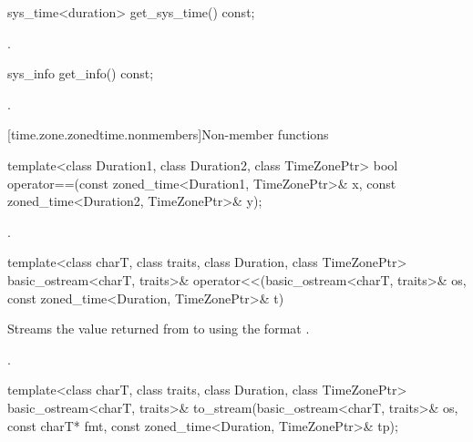 %
\begin{itemdecl}
sys_time<duration> get_sys_time() const;
\end{itemdecl}

\begin{itemdescr}
\pnum
\returns {}.
\end{itemdescr}

%
\begin{itemdecl}
sys_info get_info() const;
\end{itemdecl}

\begin{itemdescr}
\pnum
\returns {}.
\end{itemdescr}

[time.zone.zonedtime.nonmembers]{Non-member functions}

%
\begin{itemdecl}
template<class Duration1, class Duration2, class TimeZonePtr>
  bool operator==(const zoned_time<Duration1, TimeZonePtr>& x,
                  const zoned_time<Duration2, TimeZonePtr>& y);
\end{itemdecl}

\begin{itemdescr}
\pnum
\returns {}.
\end{itemdescr}

%
\begin{itemdecl}
template<class charT, class traits, class Duration, class TimeZonePtr>
  basic_ostream<charT, traits>&
    operator<<(basic_ostream<charT, traits>& os,
               const zoned_time<Duration, TimeZonePtr>& t)
\end{itemdecl}

\begin{itemdescr}
\pnum
\effects
Streams
the value returned from 
to 
using the format .

\pnum
\returns {}.
\end{itemdescr}

%
\begin{itemdecl}
template<class charT, class traits, class Duration, class TimeZonePtr>
  basic_ostream<charT, traits>&
    to_stream(basic_ostream<charT, traits>& os, const charT* fmt,
              const zoned_time<Duration, TimeZonePtr>& tp);
\end{itemdecl}

